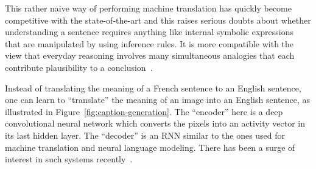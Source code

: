 \documentclass[10pts]{article}
\begin{document}
This rather naive way of performing machine translation has quickly become
competitive with the state-of-the-art and this raises serious doubts about
whether understanding a sentence requires anything like internal symbolic
expressions that are manipulated by using inference rules.
It is more compatible with
the view that everyday reasoning involves many simultaneous analogies that
each contribute plausibility to a 
conclusion~\citep{Lakoff+Johnson-2008,Rogers+McClelland-book2004}.

Instead of translating the meaning of a French sentence to an English sentence,
one can learn to ``translate'' the meaning of an image into an English sentence,
as illustrated in Figure~\ref{fig:caption-generation}. The ``encoder'' here is
a deep convolutional neural network which converts the pixels into an
activity vector in its last hidden layer. The ``decoder''
is an RNN similar to the ones used for machine translation
and neural language modeling. There has been a surge of interest in such
systems recently~\citep{Kiros-et-al-ICML2014,Mao+al-arxiv2014,Donahue-et-al-arxiv2014,
              Vinyals-et-al-arxiv2014,Fang-et-al-arxiv2014,
             Chen+Zitnick-arxiv2014,Karpathy+Li-arxiv2014,Venugopalan-et-al-arxiv2014}.
\end{document}
